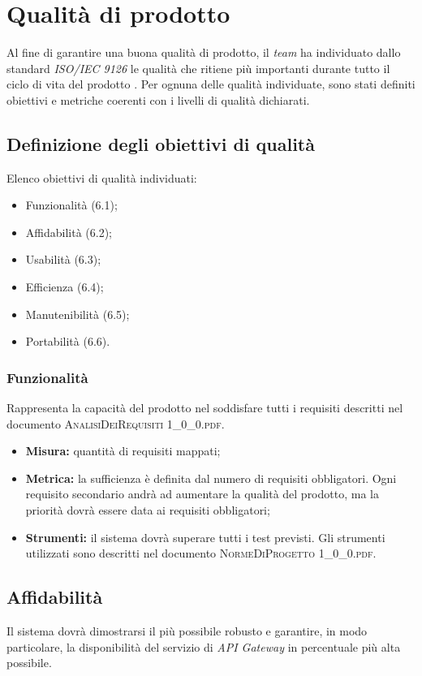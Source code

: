 \newpage
\section{Qualità di prodotto}
	
Al fine di garantire una buona qualità di prodotto, il \textit{team} ha individuato dallo standard \textit{ISO/IEC 9126} le qualità che ritiene più importanti durante tutto il ciclo di vita del prodotto \progetto. Per ognuna delle qualità individuate, sono stati definiti obiettivi e metriche coerenti con i livelli di qualità dichiarati.

\subsection{Definizione degli obiettivi di qualità}
Elenco obiettivi di qualità individuati:
\begin{itemize}
	\item Funzionalità (6.1);
	\item Affidabilità (6.2);
	\item Usabilità (6.3);
	\item Efficienza (6.4);
	\item Manutenibilità (6.5);
	\item Portabilità (6.6).
\end{itemize}
	
	\subsubsection{Funzionalità}
	Rappresenta la capacità del prodotto nel soddisfare tutti i requisiti descritti nel documento \textsc{AnalisiDeiRequisiti 1\_0\_0.pdf}.  
		
		\begin{itemize}
		\item \textbf{Misura:} quantità di requisiti mappati;
		\item \textbf{Metrica:} la sufficienza è definita dal numero di requisiti obbligatori. Ogni requisito secondario andrà ad aumentare la qualità del prodotto, ma la priorità dovrà essere data ai requisiti obbligatori;
		\item \textbf{Strumenti:} il sistema dovrà superare tutti i test previsti. Gli strumenti utilizzati sono descritti nel documento \textsc{NormeDiProgetto 1\_0\_0.pdf}.
			
		\end{itemize}
	
	\subsection{Affidabilità}
		Il sistema dovrà dimostrarsi il più possibile robusto e garantire, in modo particolare, la disponibilità del servizio di \textit{API Gateway} in percentuale più alta possibile. 
		
